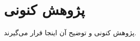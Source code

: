 \documentclass{article}[a4paper, 11px]
\begin{document}
\section{
پژوهش کنونی
}
پژوهش کنونی و توضیح آن اینجا قرار می‌گیرند.

\end{document}
